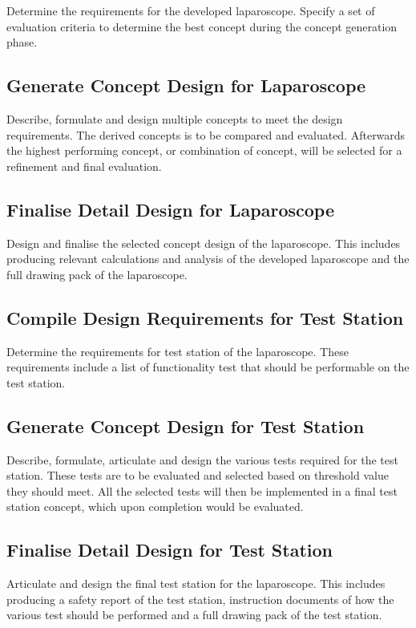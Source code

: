 Determine the requirements for the developed laparoscope. Specify a set of evaluation criteria to determine the best concept during the concept generation phase.

\subsection{Generate Concept Design for Laparoscope}

Describe, formulate and design multiple concepts to meet the design requirements. The derived concepts is to be compared and evaluated. Afterwards the highest performing concept, or combination of concept, will be selected for a refinement and final evaluation.

\subsection{Finalise Detail Design for Laparoscope}

Design and finalise the selected concept design of the laparoscope. This includes producing relevant calculations and analysis of the developed laparoscope and the full drawing pack of the laparoscope.

\subsection{Compile Design Requirements for Test Station}

Determine the requirements for test station of the laparoscope. These requirements include a list of functionality test that should be performable on the test station. 

\subsection{Generate Concept Design for Test Station}

Describe, formulate, articulate and design the various tests required for the test station. These tests are to be evaluated and selected based on threshold value they should meet. All the selected tests will then be implemented in a final test station concept, which upon completion would be evaluated. 

\subsection{Finalise Detail Design for Test Station}

Articulate and design the final test station for the laparoscope. This includes producing a safety report of the test station, instruction documents of how the various test should be performed and a full drawing pack of the test station.

